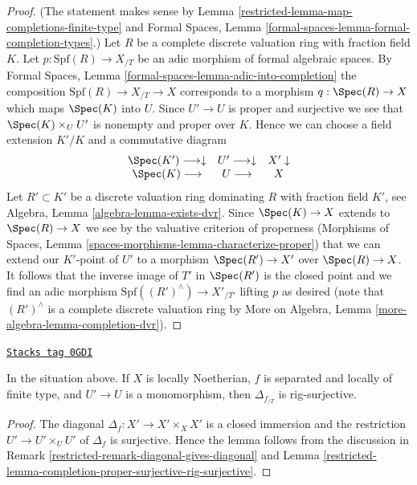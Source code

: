 \begin{proof}

(The statement makes sense by
Lemma \ref{restricted-lemma-map-completions-finite-type} and
Formal Spaces, Lemma \ref{formal-spaces-lemma-formal-completion-types}.)
Let $R$ be a complete discrete valuation ring with fraction field $K$.
Let $p : \text{Spf}(R) \to X_{/T}$ be an adic morphism of
formal algebraic spaces. By Formal Spaces, Lemma
\ref{formal-spaces-lemma-adic-into-completion}
the composition $\text{Spf}(R) \to X_{/T} \to X$
corresponds to a morphism $q : \Spec(R) \to X$
which maps $\Spec(K)$ into $U$. Since $U' \to U$ is proper and surjective
we see that $\Spec(K) \times_U U'$ is nonempty and proper over $K$.
Hence we can choose a field extension $K'/K$ and a commutative
diagram
$$
\begin{array}{ccc}\Spec(K') \longrightarrow\downarrow & U' \longrightarrow\downarrow & X' \downarrow \\ \Spec(K) \longrightarrow & U \longrightarrow & X\end{array}
$$
Let $R' \subset K'$ be a discrete valuation ring dominating $R$
with fraction field $K'$, see Algebra, Lemma \ref{algebra-lemma-exists-dvr}.
Since $\Spec(K) \to X$ extends to $\Spec(R) \to X$ we see by the valuative
criterion of properness
(Morphisms of Spaces, Lemma \ref{spaces-morphisms-lemma-characterize-proper})
that we can extend our $K'$-point of $U'$ to a morphism
$\Spec(R') \to X'$ over $\Spec(R) \to X$.
It follows that the inverse image of $T'$ in $\Spec(R')$ is the
closed point and we find an adic morphism
$\text{Spf}((R')^\wedge) \to X'_{/T'}$ lifting $p$
as desired (note that $(R')^\wedge$ is a complete discrete valuation ring
by More on Algebra, Lemma \ref{more-algebra-lemma-completion-dvr}).
\end{proof}

\begin{lemma}
\label{restricted-lemma-separated-mono-open-diagonal-rig-surjective}
\href{https://stacks.math.columbia.edu/tag/0GDI}{\texttt{Stacks tag 0GDI}}

In the situation above. If $X$ is locally Noetherian,
$f$ is separated and locally of finite type, and $U' \to U$ is
a monomorphism, then $\Delta_{f_{/T}}$ is rig-surjective.
\end{lemma}

\begin{proof}

The diagonal $\Delta_f : X' \to X' \times_X X'$ is a closed
immersion and the restriction $U' \to U' \times_U U'$ of $\Delta_f$
is surjective. Hence the lemma follows from the discussion in
Remark \ref{restricted-remark-diagonal-gives-diagonal} and
Lemma \ref{restricted-lemma-completion-proper-surjective-rig-surjective}.
\end{proof}

